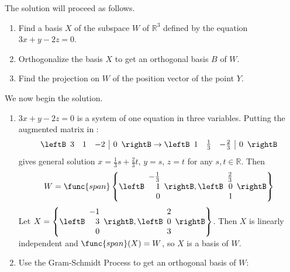 \begin{solution}
The solution will proceed as follows.
\begin{enumerate}
\item Find a basis $X$ of the subspace $W$ of $\mathbb{R}^3$ defined by
the equation  $3x+y-2z=0$.
\item Orthogonalize the basis $X$ to get an orthogonal basis
$B$ of $W$.
\item Find the projection on $W$ of the position vector of
the point $Y$.
\end{enumerate}

We now begin the solution.
\begin{enumerate}
\item $3x+y-2z=0$ is a system of one equation in three variables.
Putting the augmented matrix in \rref:
\[
\leftB\begin{array}{rrr|r} 3 & 1 & -2 & 0 \end{array}\rightB
\rightarrow
\leftB\begin{array}{rrr|r} 1 & \frac{1}{3} & -\frac{2}{3} & 0 \end{array}\rightB
\]
gives general solution $x=\frac{1}{3}s+\frac{2}{3}t$, $y=s$, $z=t$
for any $s,t\in\mathbb{R}$.
Then  
\[
W=\func{span} \left\{
\leftB\begin{array}{r} -\frac{1}{3} \\ 1 \\ 0 \end{array}\rightB,
\leftB\begin{array}{r} \frac{2}{3} \\ 0 \\ 1 \end{array}\rightB\right\}
\]
Let
$X=\left\{
\leftB\begin{array}{r} -1 \\ 3 \\ 0 \end{array}\rightB,
\leftB\begin{array}{r} 2 \\ 0 \\ 3 \end{array}\rightB\right\}$.
Then $X$ is linearly independent and $\func{span}(X)=W$, so $X$ is a basis of $W$.

\item Use the Gram-Schmidt Process to get an
orthogonal basis of $W$: 


\end{enumerate}
\end{solution}
